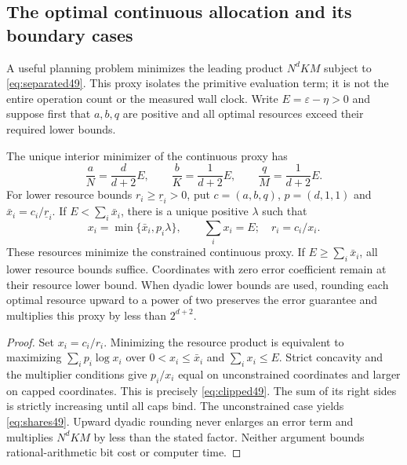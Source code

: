 \subsection{The optimal continuous allocation and its boundary cases}
A useful planning problem minimizes the leading product $N^dKM$ subject to \eqref{eq:separated49}. This proxy isolates the primitive evaluation term; it is not the entire operation count or the measured wall clock. Write $E=\varepsilon-\eta>0$ and suppose first that $a,b,q$ are positive and all optimal resources exceed their required lower bounds.

\begin{proposition}\label{prop:allocation49}
The unique interior minimizer of the continuous proxy has
\begin{equation}\label{eq:shares49}
 \frac aN=\frac d{d+2}E,\qquad
 \frac bK=\frac1{d+2}E,\qquad
 \frac qM=\frac1{d+2}E.
\end{equation}
For lower resource bounds $r_i\ge\underline r_i>0$, put
$c=(a,b,q)$, $p=(d,1,1)$ and $\bar x_i=c_i/\underline r_i$.
If $E<\sum_i\bar x_i$, there is a unique positive $\lambda$ such that
\begin{equation}\label{eq:clipped49}
 x_i=\min\{\bar x_i,p_i\lambda\},\qquad \sum_i x_i=E;
 \quad r_i=c_i/x_i.
\end{equation}
These resources minimize the constrained continuous proxy. If $E\ge\sum_i\bar x_i$, all lower resource bounds suffice. Coordinates with zero error coefficient remain at their resource lower bound. When dyadic lower bounds are used, rounding each optimal resource upward to a power of two preserves the error guarantee and multiplies this proxy by less than $2^{d+2}$.
\end{proposition}
\begin{proof}
Set $x_i=c_i/r_i$. Minimizing the resource product is equivalent to maximizing $\sum_i p_i\log x_i$ over $0<x_i\le\bar x_i$ and $\sum_i x_i\le E$. Strict concavity and the multiplier conditions give $p_i/x_i$ equal on unconstrained coordinates and larger on capped coordinates. This is precisely \eqref{eq:clipped49}. The sum of its right sides is strictly increasing until all caps bind. The unconstrained case yields \eqref{eq:shares49}. Upward dyadic rounding never enlarges an error term and multiplies $N^dKM$ by less than the stated factor. Neither argument bounds rational-arithmetic bit cost or computer time.
\end{proof}

